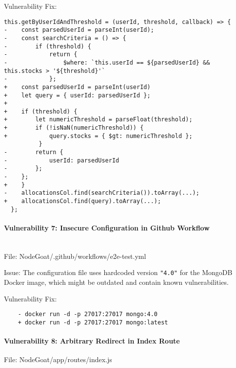   Vulnerability Fix:
  
  \begin{framed}
  \begin{verbatim}
this.getByUserIdAndThreshold = (userId, threshold, callback) => {
-    const parsedUserId = parseInt(userId);
-    const searchCriteria = () => {
-        if (threshold) {
-            return {
-                $where: `this.userId == ${parsedUserId} && this.stocks > '${threshold}'`
-            };
+    const parsedUserId = parseInt(userId)
+    let query = { userId: parsedUserId };
+
+    if (threshold) {
+        let numericThreshold = parseFloat(threshold);
+        if (!isNaN(numericThreshold)) {
+            query.stocks = { $gt: numericThreshold };
          }
-        return {
-            userId: parsedUserId
-        };
-    };
+    }
-    allocationsCol.find(searchCriteria()).toArray(...);
+    allocationsCol.find(query).toArray(...);
  };
  \end{verbatim}
  \end{framed}
  
  \hypertarget{vulnerability-7-insecure-configuration-in-github-workflow}{%
  \paragraph{Vulnerability 7: Insecure Configuration in Github
  Workflow}\label{vulnerability-7-insecure-configuration-in-github-workflow}}
  \\
  File: NodeGoat/.github/workflows/e2e-test.yml
  
  Issue: The configuration file uses hardcoded version \texttt{"4.0"} for
  the MongoDB Docker image, which might be outdated and contain known
  vulnerabilities.
  
  Vulnerability Fix:
  
  \begin{verbatim}
    - docker run -d -p 27017:27017 mongo:4.0
    + docker run -d -p 27017:27017 mongo:latest
    \end{verbatim}
    
  
  \hypertarget{vulnerability-8-arbitrary-redirect-in-index-route}{%
  \paragraph{Vulnerability 8: Arbitrary Redirect in Index
  Route}\label{vulnerability-8-arbitrary-redirect-in-index-route}}
  
  File: NodeGoat/app/routes/index.js
  
